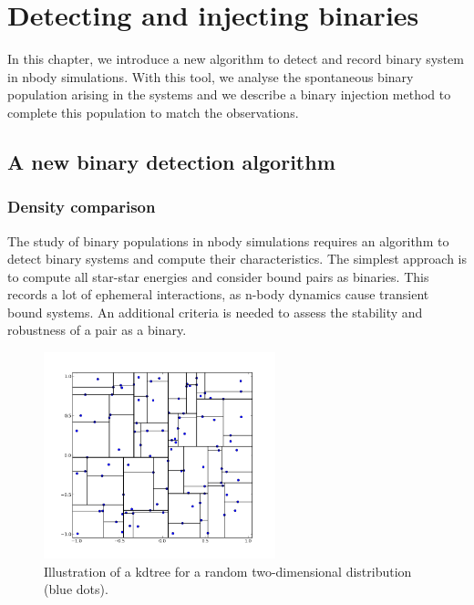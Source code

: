 
\chapter{Detecting and injecting binaries}


In this chapter, we introduce a new algorithm to detect and record binary system in nbody simulations. With this tool, we analyse the spontaneous binary population arising in the \HubLem systems and we describe a binary injection method to complete this population to match the observations.




\section{A new binary detection algorithm}


\subsection{Density comparison}

The study of binary populations in nbody simulations requires an algorithm to detect binary systems and compute their characteristics. The simplest approach is to compute all star-star energies and consider bound pairs as binaries. This records a lot of ephemeral interactions, as n-body dynamics cause transient bound systems. An additional criteria is needed to assess the stability and robustness of a pair as a binary.

\begin{figure}
\begin{center}
\includegraphics[width=0.6\textwidth]{Figures/5_kdtree}
\caption{Illustration of a kdtree for a random two-dimensional distribution (blue dots).}
\label{Fig:5_kdtree}
\end{center}
\end{figure}


